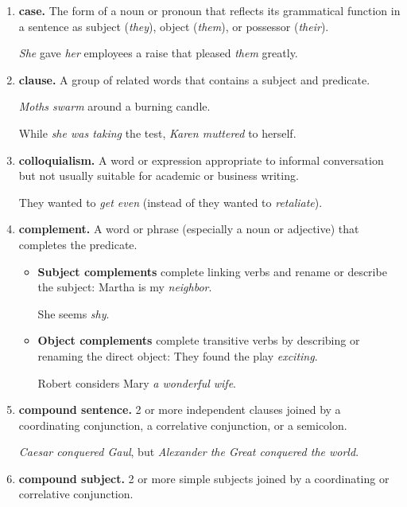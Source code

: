 \documentclass{book}
\numberwithin{equation}{section}
\begin{document}
\begin{enumerate}
    The most common auxiliaries are forms of \textit{be, do}, and \textit{have}.
    
    I \textit{am} going; we \textit{did} not go; they \textit{have} gone. (See also \textit{modal auxiliaries}.)
    \item \textbf{case.} The form of a noun or pronoun that reflects its grammatical function in a sentence as subject (\textit{they}), object (\textit{them}), or possessor (\textit{their}).
    
    \textit{She} gave \textit{her} employees a raise that pleased \textit{them} greatly.
    \item \textbf{clause.} A group of related words that contains a subject and predicate.
    
    \textit{Moths swarm} around a burning candle.
    
    While \textit{she was taking} the test, \textit{Karen muttered} to herself.
    \item \textbf{colloquialism.} A word or expression appropriate to informal conversation but not usually suitable for academic or business writing.
    
    They wanted to \textit{get even} (instead of they wanted to \textit{retaliate}).
    \item \textbf{complement.} A word or phrase (especially a noun or adjective) that completes the predicate.
    \begin{itemize}
        \item \textbf{Subject complements} complete linking verbs and rename or describe the subject: Martha is my \textit{neighbor}.
        
        She seems \textit{shy}.
        \item \textbf{Object complements} complete transitive verbs by describing or renaming the direct object: They found the play \textit{exciting}.
        
        Robert considers Mary \textit{a wonderful wife}.
    \end{itemize}
    \item \textbf{compound sentence.} 2 or more independent clauses joined by a coordinating conjunction, a correlative conjunction, or a semicolon.
    
    \textit{Caesar conquered Gaul}, but \textit{Alexander the Great conquered the world}.
    \item \textbf{compound subject.} 2 or more simple subjects joined by a coordinating or correlative conjunction.
    

\end{enumerate}
\end{document}
